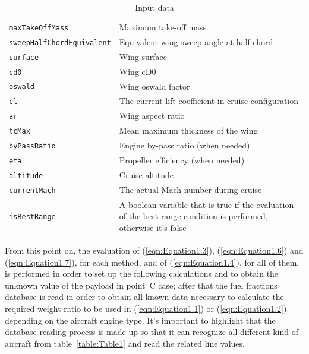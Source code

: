 \documentclass[a4paper,12pt,oneside]{book}
\begin{document}
\begin{table}[!ht]
\begin{tabular}{p{5cm}p{8cm}}
\toprule
\lstinline[language=Java]!maxTakeOffMass! & Maximum take-off mass \\[0.1	cm]
\lstinline[language=Java]!sweepHalfChordEquivalent! & Equivalent wing sweep angle at half chord \\[0.1cm]
\lstinline[language=Java]!surface! & Wing surface \\[0.1cm]
\lstinline[language=Java]!cd0!	& Wing cD0 \\[0.1cm]
\lstinline[language=Java]!oswald!	& Wing oswald factor \\[0.1cm]
\lstinline[language=Java]!cl!	& The current lift coefficient in cruise configuration \\[0.1cm]
\lstinline[language=Java]!ar!	& Wing aspect ratio \\[0.1cm]
\lstinline[language=Java]!tcMax! & Mean maximum thickness of the wing \\[0.1cm]
\lstinline[language=Java]!byPassRatio! & Engine by-pass ratio (when needed) \\[0.1cm]
\lstinline[language=Java]!eta! & Propeller efficiency (when needed) \\[0.1cm]
\lstinline[language=Java]!altitude! & Cruise altitude \\[0.1cm]
\lstinline[language=Java]!currentMach! & The actual Mach number during cruise \\[0.1cm]
\lstinline[language=Java]!isBestRange! & A boolean variable that is true if the evaluation of the best range condition is performed, otherwise it's false         \\
\bottomrule
\end{tabular}
\caption{Input data}
\label{table:Table2}
\end{table}

From this point on, the evaluation of (\ref{eqn:Equation1.3}), (\ref{eqn:Equation1.6}) and (\ref{eqn:Equation1.7}), for each method, and of (\ref{eqn:Equation1.4}), for all of them, is performed in order to set up the following calculations and to obtain the unknown value of the payload in point~C case; after that the fuel fractions database is read in order to obtain all known data necessary to calculate the required weight ratio to be used in (\ref{eqn:Equation1.1}) or (\ref{eqn:Equation1.2}) depending on the aircraft engine type. It’s important to highlight that the database reading process is made up so that it can recognize all different kind of aircraft from table~\ref{table:Table1} and read the related line values.
\end{document}
